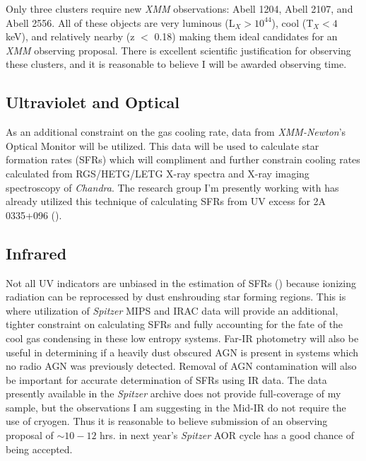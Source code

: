 \documentclass[11pt]{article}
\begin{document}
Only three clusters require new {\it XMM} observations: Abell
1204, Abell 2107, and Abell 2556. All of these objects are very
luminous (L$_X > 10^{44}$), cool (T$_X < 4$ keV), and relatively
nearby (z $<$ 0.18) making them ideal candidates for an {\it XMM}
observing proposal. There is excellent scientific justification for
observing these clusters, and it is reasonable to believe I will be
awarded observing time.

\subsection{Ultraviolet and Optical}
As an additional constraint on the gas cooling rate, data from {\it
XMM-Newton}'s Optical Monitor will be utilized. This data will be used
to calculate star formation rates (SFRs) which will compliment and further
constrain cooling rates calculated from RGS/HETG/LETG X-ray spectra
and X-ray imaging spectroscopy of {\it Chandra}. The research group
I'm presently working with has already utilized this technique of
calculating SFRs from UV excess for 2A 0335+096
(\cite{2007AJ....134...14D}).

\subsection{Infrared}
Not all UV indicators are unbiased in the estimation of SFRs
(\cite{2007ApJ...666..870C}) because ionizing radiation can be
reprocessed by dust enshrouding star forming regions. This is where
utilization of {\it Spitzer} MIPS and IRAC data will provide an
additional, tighter constraint on calculating SFRs and fully
accounting for the fate of the cool gas condensing in these low
entropy systems. Far-IR photometry will also be useful in determining
if a heavily dust obscured AGN is present in systems which no radio
AGN was previously detected. Removal of AGN contamination will also be
important for accurate determination of SFRs using IR data. The data
presently available in the {\it Spitzer} archive does not provide
full-coverage of my sample, but the observations I am suggesting in
the Mid-IR do not require the use of cryogen. Thus it is reasonable to
believe submission of an observing proposal of $\sim 10-12$ hrs. in
next year's {\it Spitzer} AOR cycle has a good chance of being
accepted.
\end{document}
